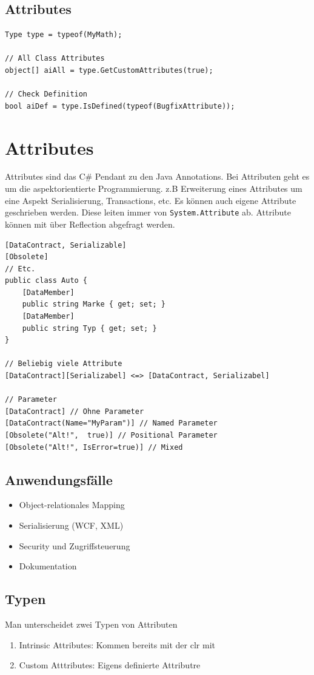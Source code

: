 \documentclass[
a4paper,
oneside,
10pt,
fleqn,
headsepline,
toc=listofnumbered, 
bibliography=totocnumbered]{scrartcl}
\let\stdsection\section
\renewcommand\section{\clearpage\stdsection}
\begin{document}
\subsection{Attributes}
\begin{lstlisting}[caption=Reflection: Attributes]
Type type = typeof(MyMath);

// All Class Attributes
object[] aiAll = type.GetCustomAttributes(true);

// Check Definition
bool aiDef = type.IsDefined(typeof(BugfixAttribute));
\end{lstlisting}

\section{Attributes}
Attributes sind das C\# Pendant zu den Java Annotations. Bei Attributen geht es um die aspektorientierte Programmierung. z.B Erweiterung eines Attributes um eine Aspekt Serialisierung, Transactions, etc. Es können auch eigene Attribute geschrieben werden. Diese leiten immer von \lstinline|System.Attribute| ab. Attribute können mit über Reflection abgefragt werden. 
\begin{lstlisting}[caption=Attributes]
[DataContract, Serializable]
[Obsolete]
// Etc.
public class Auto {
	[DataMember]
	public string Marke { get; set; }
	[DataMember]
	public string Typ { get; set; }
}

// Beliebig viele Attribute
[DataContract][Serializabel] <=> [DataContract, Serializabel]

// Parameter
[DataContract] // Ohne Parameter
[DataContract(Name="MyParam")] // Named Parameter
[Obsolete("Alt!",  true)] // Positional Parameter
[Obsolete("Alt!", IsError=true)] // Mixed
\end{lstlisting}

\subsection{Anwendungsfälle}
\begin{itemize}
	\item Object-relationales Mapping
	\item Serialisierung (WCF, XML)
	\item Security und Zugriffsteuerung
	\item Dokumentation
\end{itemize}

\subsection{Typen}
Man unterscheidet zwei Typen von Attributen
\begin{enumerate}
	\item Intrinsic Attributes: Kommen bereits mit der \gls{clr} mit 
	\item Custom Atttributes: Eigens definierte Attributre
\end{enumerate}
\end{document}

